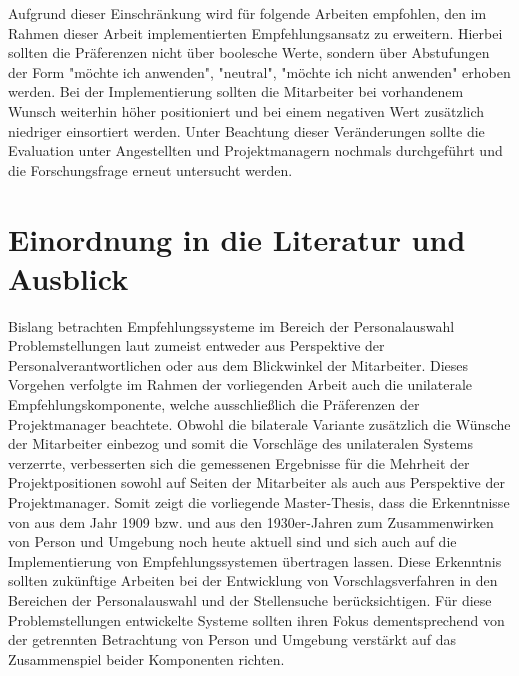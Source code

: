 Aufgrund dieser Einschränkung wird für folgende Arbeiten empfohlen, den im Rahmen dieser Arbeit implementierten Empfehlungsansatz zu erweitern. Hierbei sollten die Präferenzen nicht über boolesche Werte, sondern über Abstufungen der Form "möchte ich anwenden", "neutral", "möchte ich nicht anwenden" erhoben werden. Bei der Implementierung sollten die Mitarbeiter bei vorhandenem Wunsch weiterhin höher positioniert und bei einem negativen Wert zusätzlich niedriger einsortiert werden. Unter Beachtung dieser Veränderungen sollte die Evaluation unter Angestellten und Projektmanagern nochmals durchgeführt und die Forschungsfrage erneut untersucht werden.

\section{Einordnung in die Literatur und Ausblick}
\label{ch:diskussion:einordnung}
Bislang betrachten Empfehlungssysteme im Bereich der Personalauswahl Problemstellungen laut \textcite[S. 1ff.]{malinowski:2006} zumeist entweder aus Perspektive der Personalverantwortlichen oder aus dem Blickwinkel der Mitarbeiter. Dieses Vorgehen verfolgte im Rahmen der vorliegenden Arbeit auch die unilaterale Empfehlungskomponente, welche ausschließlich die Präferenzen der Projektmanager beachtete. Obwohl die bilaterale Variante zusätzlich die Wünsche der Mitarbeiter einbezog und somit die Vorschläge des unilateralen Systems verzerrte, verbesserten sich die gemessenen Ergebnisse für die Mehrheit der Projektpositionen sowohl auf Seiten der Mitarbeiter als auch aus Perspektive der Projektmanager. Somit zeigt die vorliegende Master-Thesis, dass die Erkenntnisse von \textcite[S. 5ff.]{parsons:1909} aus dem Jahr 1909 bzw. \textcite[S. 11f.]{lewin:1936} und \textcite[S. 38ff.]{murray:1938} aus den 1930er-Jahren zum Zusammenwirken von Person und Umgebung noch heute aktuell sind und sich auch auf die Implementierung von Empfehlungssystemen übertragen lassen. Diese Erkenntnis sollten zukünftige Arbeiten bei der Entwicklung von Vorschlagsverfahren in den Bereichen der Personalauswahl und der Stellensuche berücksichtigen. Für diese Problemstellungen entwickelte Systeme sollten ihren Fokus dementsprechend von der getrennten Betrachtung von Person und Umgebung verstärkt auf das Zusammenspiel beider Komponenten richten. 
